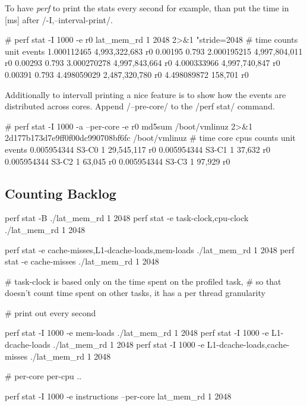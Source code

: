 \stoptyping

To have {\em perf} to print the stats every second for example, than put
the time in [ms] after /-I,--interval-print/.

\starttyping
# perf stat -I 1000 -e r0 lat_mem_rd 1 2048 2>&1
"stride=2048
#           time             counts unit events
     1.000112465      4,993,322,683      r0
0.00195 0.793
     2.000195215      4,997,804,011      r0
0.00293 0.793
     3.000270278      4,997,843,664      r0
     4.000333966      4,997,740,847      r0
0.00391 0.793
     4.498059029      2,487,320,780      r0
     4.498089872            158,701      r0
\stoptyping

Additionally to intervall printing a nice feature is to show how the
events are distributed across cores. Append /--pre-core/ to the /perf
stat/ command.

\starttyping
# perf stat -I 1000 -a --per-core -e r0 md5sum /boot/vmlinuz 2>&1
2d177b173d7e9ff0f00dc990708bf6fc  /boot/vmlinuz
#           time core         cpus             counts unit events
     0.005954344 S3-C0           1         29,545,117      r0
     0.005954344 S3-C1           1             37,632      r0
     0.005954344 S3-C2           1             63,045      r0
     0.005954344 S3-C3           1             97,929      r0
\stoptyping

\subsection{Counting Backlog}

\starttyping

 perf stat -B ./lat_mem_rd 1 2048
 perf stat -e task-clock,cpu-clock ./lat_mem_rd 1 2048

 perf stat -e cache-misses,L1-dcache-loads,mem-loads ./lat_mem_rd 1 2048
 perf stat -e cache-misses ./lat_mem_rd 1 2048

 # task-clock is based only on the time spent on the profiled task,
 # so that doesn't count time spent on other tasks, it has a per thread granularity

 # print out every second

 perf stat -I 1000 -e mem-loads ./lat_mem_rd 1 2048
 perf stat -I 1000 -e L1-dcache-loads ./lat_mem_rd 1 2048
 perf stat -I 1000 -e L1-dcache-loads,cache-misses ./lat_mem_rd 1 2048

 # per-core per-cpu ..

 perf stat -I 1000 -e instructions --per-core lat_mem_rd 1 2048
\stoptyping
